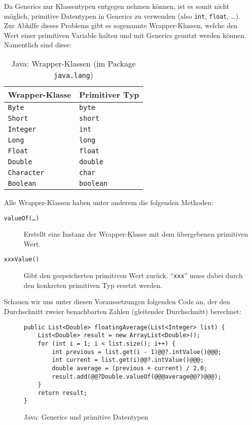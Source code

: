 		Da Generics nur Klassentypen entgegen nehmen können, ist es somit nicht möglich, primitive Datentypen in Generics zu verwenden (also \texttt{int}, \texttt{float}, \dots). Zur Abhilfe dieses Problems gibt es sogenannte Wrapper-Klassen, welche den Wert einer primitiven Variable halten und mit Generics genutzt werden können. Namentlich sind diese:
		\begin{table}[H]
			\centering
			\begin{tabular}{l | l}
				Wrapper-Klasse     & Primitiver Typ   \\ \hline
				\texttt{Byte}      & \texttt{byte}    \\
				\texttt{Short}     & \texttt{short}   \\
				\texttt{Integer}   & \texttt{int}     \\
				\texttt{Long}      & \texttt{long}    \\
				\texttt{Float}     & \texttt{float}   \\
				\texttt{Double}    & \texttt{double}  \\
				\texttt{Character} & \texttt{char}    \\
				\texttt{Boolean}   & \texttt{boolean}
			\end{tabular}
			\caption{Java: Wrapper-Klassen (im Package \texttt{java.lang})}
		\end{table}
		Alle Wrapper-Klassen haben unter anderem die folgenden Methoden:
		\begin{description}
			\item[\texttt{valueOf(\dots)}] Erstellt eine Instanz der Wrapper-Klasse mit dem übergebenen primitiven Wert.
			\item[\texttt{xxxValue()}]     Gibt den gespeicherten primitiven Wert zurück. \enquote{\texttt{xxx}} muss dabei durch den konkreten primitiven Typ ersetzt werden.
		\end{description}
		
		Schauen wir uns unter diesen Voraussetzungen folgenden Code an, der den Durchschnitt zweier benachbarten Zahlen (gleitender Durchschnitt) berechnet:
		\begin{figure}[H]
			\centering
			\begin{lstlisting}[style = base]
public List<Double> floatingAverage(List<Integer> list) {
	List<Double> result = new ArrayList<Double>();
	for (int i = 1; i < list.size(); i++) {
		int previous = list.get(i - 1)@@?.intValue()@@@;
		int current = list.get(i)@@?.intValue()@@@;
		double average = (previous + current) / 2.0;
		result.add(@@?Double.valueOf(@@@average@@?)@@@);
	}
	return result;
}
			\end{lstlisting}
			\caption{Java: Generics und primitive Datentypen}
			\label{fig:java_generics_motivation_gen}
		\end{figure}
		
